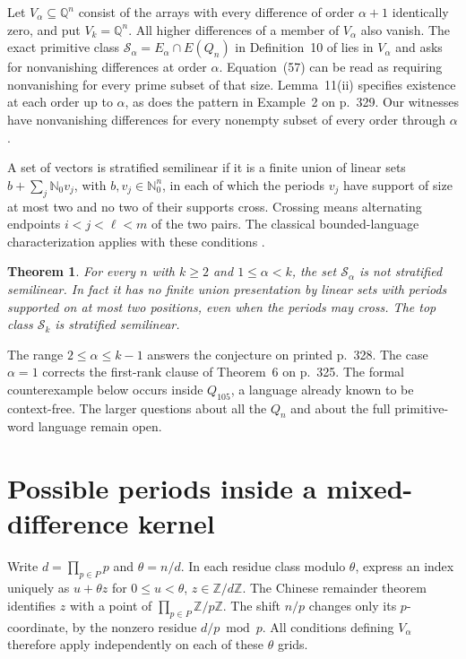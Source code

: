 \documentclass[11pt]{article}
\newtheorem{theorem}{Theorem}
\newcommand{\N}{\mathbb N_0}
\newcommand{\Z}{\mathbb Z}
\newcommand{\Q}{\mathbb Q}
\newcommand{\rankset}{\mathcal S}
\begin{document}
Let \(V_\alpha\subseteq\Q^n\) consist of the arrays with every
difference of order \(\alpha+1\) identically zero, and put
\(V_k=\Q^n\). All higher differences of a member of \(V_\alpha\)
also vanish. The exact primitive class \(\rankset_\alpha=E_\alpha\cap
E(Q_n)\) in Definition~10 of \cite{kasonyi} lies in \(V_\alpha\) and
asks for nonvanishing differences at order \(\alpha\). Equation~(57)
can be read as requiring nonvanishing for every prime subset of that
size. Lemma~11(ii) specifies existence at each order up to
\(\alpha\), as does the pattern in Example~2 on p.~329. Our witnesses
have nonvanishing differences for every
nonempty subset of every order through \(\alpha\).

A set of vectors is stratified semilinear if it is a finite union of
linear sets \(b+\sum_j\N v_j\), with \(b,v_j\in\N^n\), in each of
which the periods \(v_j\) have support of size at most two and no two
of their supports cross. Crossing means alternating endpoints
\(i<j<\ell<m\) of the two pairs. The classical bounded-language
characterization applies with these conditions \cite{ginsburg}.

\begin{theorem}\label{main}
For every \(n\) with \(k\ge2\) and \(1\le\alpha<k\), the set
\(\rankset_\alpha\) is not stratified semilinear. In fact it has no
finite union presentation by linear sets with periods supported on at
most two positions, even when the periods may cross. The top class
\(\rankset_k\) is stratified semilinear.
\end{theorem}

The range \(2\le\alpha\le k-1\) answers the conjecture on printed
p.~328. The case \(\alpha=1\) corrects the first-rank clause of
Theorem~6 on p.~325. The formal counterexample below occurs inside
\(Q_{105}\), a language already known to be context-free. The larger
questions about all the \(Q_n\) and about the full primitive-word
language remain open.

\section{Possible periods inside a mixed-difference kernel}
Write \(d=\prod_{p\in P}p\) and \(\theta=n/d\). In each residue class
modulo \(\theta\), express an index uniquely as \(u+\theta z\) for
\(0\le u<\theta\), \(z\in\Z/d\Z\). The Chinese remainder theorem
identifies \(z\) with a point of \(\prod_{p\in P}\Z/p\Z\).
The shift \(n/p\) changes only its \(p\)-coordinate, by the nonzero
residue \(d/p\bmod p\). All conditions defining \(V_\alpha\)
therefore apply independently on each of these \(\theta\) grids.
\end{document}
